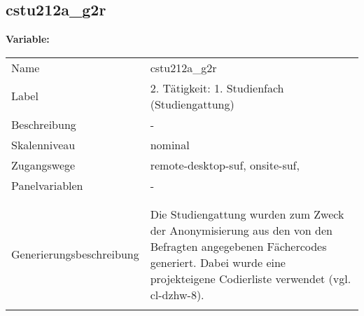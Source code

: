 	
	
	\subsection{cstu212a\_g2r}
	\label{subSection:cstu212a_g2r}

	\noindent\textbf{Variable:}\\
		\begin{tabular}{lL{11.3cm}}
			\label{tableVariable:cstu212a_g2r}
			Name & cstu212a\_g2r \\
			Label & 2. Tätigkeit: 1. Studienfach (Studiengattung) \\
			Beschreibung & - \\
			Skalenniveau & nominal \\
			Zugangswege &
				remote-desktop-suf,
				onsite-suf,
 \\
			Panelvariablen & -
			 \\
			 \\
 \\
					Generierungsbeschreibung & Die Studiengattung wurden zum Zweck der Anonymisierung aus den von den Befragten angegebenen Fächercodes generiert.  Dabei wurde eine projekteigene Codierliste verwendet (vgl. cl-dzhw-8).
				 \\	
			 \\
		\end{tabular}






